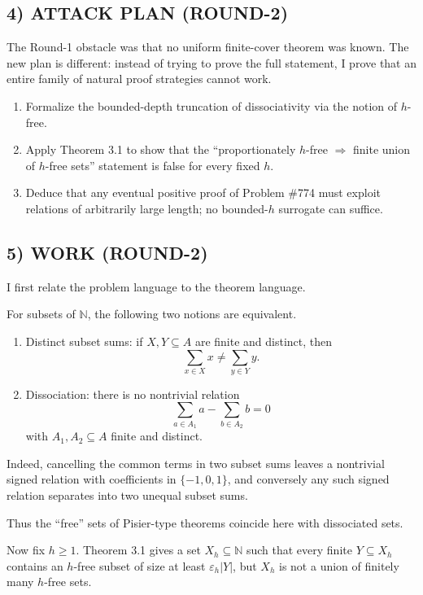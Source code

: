 \subsection*{4) ATTACK PLAN (ROUND-2)}
The Round-1 obstacle was that no uniform finite-cover theorem was known. The new plan is different: instead of trying to prove the full statement, I prove that an entire family of natural proof strategies cannot work.

\begin{enumerate}
\item Formalize the bounded-depth truncation of dissociativity via the notion of $h$-free.
\item Apply Theorem 3.1 to show that the ``proportionately $h$-free $\Rightarrow$ finite union of $h$-free sets'' statement is false for every fixed $h$.
\item Deduce that any eventual positive proof of Problem \#774 must exploit relations of arbitrarily large length; no bounded-$h$ surrogate can suffice.
\end{enumerate}

\subsection*{5) WORK (ROUND-2)}
I first relate the problem language to the theorem language.

For subsets of $\mathbb N$, the following two notions are equivalent.

\begin{enumerate}
\item Distinct subset sums: if $X,Y\subseteq A$ are finite and distinct, then
\[
\sum_{x\in X}x\ne \sum_{y\in Y}y.
\]
\item Dissociation: there is no nontrivial relation
\[
\sum_{a\in A_1} a - \sum_{b\in A_2} b =0
\]
with $A_1,A_2\subseteq A$ finite and distinct.
\end{enumerate}

Indeed, cancelling the common terms in two subset sums leaves a nontrivial signed relation with coefficients in $\{ -1,0,1\}$, and conversely any such signed relation separates into two unequal subset sums.

Thus the ``free'' sets of Pisier-type theorems coincide here with dissociated sets.

\medskip
Now fix $h\ge 1$. Theorem 3.1 gives a set $X_h\subseteq\mathbb N$ such that every finite $Y\subseteq X_h$ contains an $h$-free subset of size at least $\varepsilon_h|Y|$, but $X_h$ is not a union of finitely many $h$-free sets.

